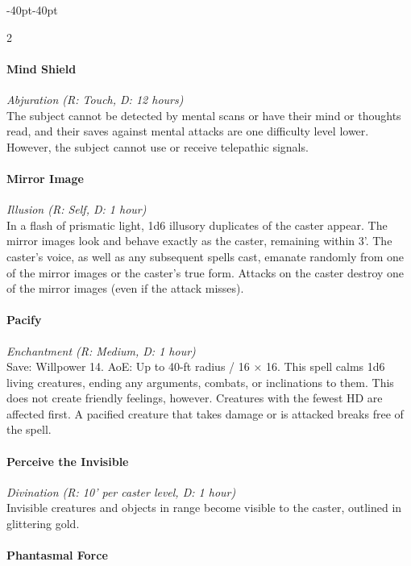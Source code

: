 \documentclass{book}
\begin{document}
\begin{adjustwidth}{-40pt}{-40pt}
\begin{multicols}{2}
\paragraph{Mind Shield}\label{mind-shield}

\emph{Abjuration (R: Touch, D: 12 hours)}\\
The subject cannot be detected by mental scans or have their mind or
thoughts read, and their saves against mental attacks are one difficulty
level lower. However, the subject cannot use or receive telepathic
signals.

\paragraph{Mirror Image}\label{mirror-image}

\emph{Illusion (R: Self, D: 1 hour)}\\
In a flash of prismatic light, 1d6 illusory duplicates of the caster
appear. The mirror images look and behave exactly as the caster,
remaining within 3'. The caster's voice, as well as any subsequent
spells cast, emanate randomly from one of the mirror images or the
caster's true form. Attacks on the caster destroy one of the mirror
images (even if the attack misses).

\paragraph{Pacify}\label{pacify}

\emph{Enchantment (R: Medium, D: 1 hour)}\\
Save: Willpower 14. AoE: Up to 40-ft radius / 16 × 16. This spell calms
1d6 living creatures, ending any arguments, combats, or inclinations to
them. This does not create friendly feelings, however. Creatures with
the fewest HD are affected first. A pacified creature that takes damage
or is attacked breaks free of the spell.

\paragraph{Perceive the Invisible}\label{perceive-the-invisible}

\emph{Divination (R: 10' per caster level, D: 1 hour)}\\
Invisible creatures and objects in range become visible to the caster,
outlined in glittering gold.

\paragraph{Phantasmal Force}\label{phantasmal-force}


\end{multicols}
\end{adjustwidth}
\end{document}
